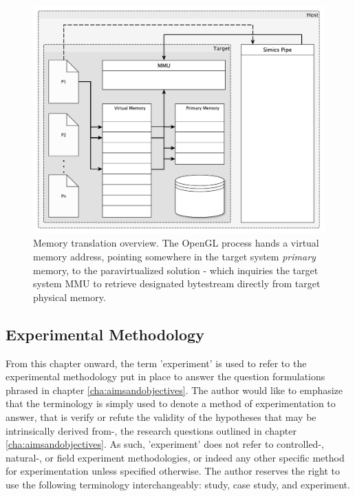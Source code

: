 \begin{figure}
\centering
\includegraphics[width=\linewidth]{img/yedvirtualmemory.pdf}
\caption[Memory translation overview]{Memory translation overview. The OpenGL process hands a virtual memory address, pointing somewhere in the target system \textit{primary} memory, to the paravirtualized solution - which inquiries the target system MMU to retrieve designated bytestream directly from target physical memory.}
\label{fig:virtualmemory}
\end{figure}

\subsection{Experimental Methodology}
\label{sec:experimentalmethodology}
From this chapter onward, the term 'experiment' is used to refer to the experimental methodology put in place to answer the question formulations phrased in chapter \ref{cha:aimsandobjectives}.
The author would like to emphasize that the terminology is simply used to denote a method of experimentation to answer, that is verify or refute the validity of the hypotheses that may be intrinsically derived from-, the research questions outlined in chapter \ref{cha:aimsandobjectives}.
As such, 'experiment' does not refer to controlled-, natural-, or field experiment methodologies, or indeed any other specific method for experimentation unless specified otherwise.
The author reserves the right to use the following terminology interchangeably: study, case study, and experiment.

